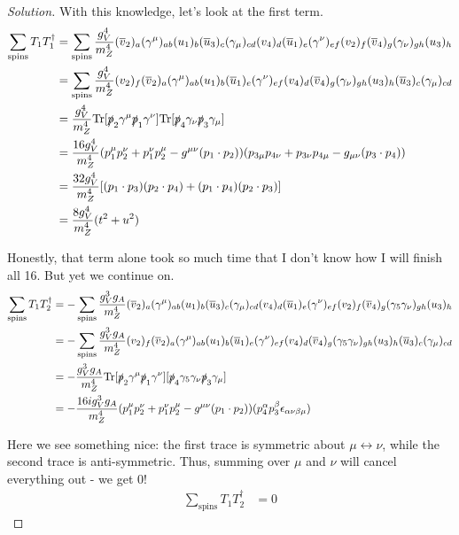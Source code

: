 \documentclass[12pt]{article}
\newenvironment{solution}{\begin{proof}[Solution]}{\end{proof}}
\begin{document}
\begin{solution}
With this knowledge, let's look at the first term.
\begin{align*}
    \sum_\text{spins}T_1T_1^\dagger&=\sum_\text{spins}\frac{g_V^4}{m_Z^4}(\overline{v}_2)_a (\gamma^\mu)_{ab}(u_1)_b (\overline{u}_3)_c (\gamma_\mu)_{cd} (v_4)_d (\overline{u}_1)_e (\gamma^\nu)_{ef}(v_2)_f (\overline{v}_4)_g (\gamma_\nu)_{gh} (u_3)_h \\
    &= \sum_\text{spins}\frac{g_V^4}{m_Z^4} (v_2)_f (\overline{v}_2)_a (\gamma^\mu)_{ab} (u_1)_b (\overline{u}_1)_e (\gamma^\nu)_{ef} (v_4)_d(\overline{v}_4)_g(\gamma_\nu)_{gh}(u_3)_h(\overline{u}_3)_c (\gamma_\mu)_{cd} \\
    &= \frac{g_V^4}{m_Z^4}\text{Tr}[\slashed{p}_2\gamma^\mu \slashed{p}_1 \gamma^\nu]\text{Tr}[\slashed{p}_4\gamma_\nu \slashed{p}_3 \gamma_\mu] \\
    &= \frac{16g_V^4}{m_Z^4} (p_1^\mu p_2^\nu + p_1^\nu p_2^\mu - g^{\mu\nu}(p_1\cdot p_2))(p_{3\mu} p_{4\nu} + p_{3\nu} p_{4\mu} - g_{\mu\nu}(p_3\cdot p_4)) \\
    &= \frac{32g_V^4}{m_Z^4}[(p_1\cdot p_3)(p_2 \cdot p_4)+(p_1\cdot p_4)(p_2\cdot p_3)] \\
    &= \frac{8g_V^4}{m_Z^4}(t^2+u^2)
\end{align*}

Honestly, that term alone took so much time that I don't know how I will finish all 16. But yet we continue on.
\begin{align*}
    \sum_\text{spins}T_1T_2^\dagger&=-\sum_\text{spins}\frac{g_V^3g_A}{m_Z^4}(\overline{v}_2)_a (\gamma^\mu)_{ab}(u_1)_b (\overline{u}_3)_c (\gamma_\mu)_{cd} (v_4)_d (\overline{u}_1)_e (\gamma^\nu)_{ef}(v_2)_f (\overline{v}_4)_g (\gamma_5\gamma_\nu)_{gh} (u_3)_h \\
    &=-\sum_\text{spins}\frac{g_V^3g_A}{m_Z^4}(v_2)_f(\overline{v}_2)_a (\gamma^\mu)_{ab}(u_1)_b(\overline{u}_1)_e (\gamma^\nu)_{ef}(v_4)_d(\overline{v}_4)_g (\gamma_5\gamma_\nu)_{gh} (u_3)_h(\overline{u}_3)_c (\gamma_\mu)_{cd}\\
    &= -\frac{g_V^3g_A}{m_Z^4}\text{Tr}[\slashed{p}_2\gamma^\mu \slashed{p}_1\gamma^\nu][\slashed{p}_4\gamma_5\gamma_\nu \slashed{p}_3\gamma_\mu] \\
    &=-\frac{16ig_V^3g_A}{m_Z^4}(p_1^\mu p_2^\nu + p_1^\nu p_2^\mu - g^{\mu\nu}(p_1\cdot p_2))(p_4^\alpha p_3^\beta \epsilon_{\alpha \nu \beta \mu})
\end{align*}

Here we see something nice: the first trace is symmetric about $\mu\leftrightarrow \nu$, while the second trace is anti-symmetric. Thus, summing over $\mu$ and $\nu$ will cancel everything out - we get 0!
\begin{align*}
    \sum_\text{spins}T_1T_2^\dagger&=0
\end{align*}


\end{solution}
\end{document}
